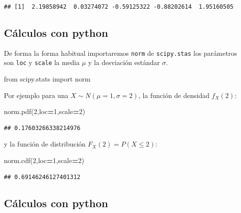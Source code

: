 \documentclass[]{book}
\newenvironment{Shaded}{\begin{snugshade}}{\end{snugshade}}
\newcommand{\DecValTok}[1]{\textcolor[rgb]{0.00,0.00,0.81}{#1}}
\newcommand{\ImportTok}[1]{#1}
\newcommand{\NormalTok}[1]{#1}
\newcommand{\OperatorTok}[1]{\textcolor[rgb]{0.81,0.36,0.00}{\textbf{#1}}}
\begin{document}
\begin{verbatim}
## [1]  2.19858942  0.03274072 -0.59125322 -0.88202614  1.95160505
\end{verbatim}

\hypertarget{cuxe1lculos-con-python-18}{%
\subsection{Cálculos con python}\label{cuxe1lculos-con-python-18}}

De forma la forma habitual importaremos \texttt{norm} de \texttt{scipy.stas} los parámetros son \texttt{loc} y \texttt{scale} la media \(\mu\) y la desviación estándar \(\sigma\).

\begin{Shaded}
\begin{Highlighting}[]
\ImportTok{from}\NormalTok{ scipy.stats }\ImportTok{import}\NormalTok{ norm}
\end{Highlighting}
\end{Shaded}

Por ejemplo para una \(X\sim N(\mu=1,\sigma=2)\), la función de densidad \(f_X(2)\):

\begin{Shaded}
\begin{Highlighting}[]
\NormalTok{norm.pdf(}\DecValTok{2}\NormalTok{,loc}\OperatorTok{=}\DecValTok{1}\NormalTok{,scale}\OperatorTok{=}\DecValTok{2}\NormalTok{)}
\end{Highlighting}
\end{Shaded}

\begin{verbatim}
## 0.17603266338214976
\end{verbatim}

y la función de distribución \(F_X(2) = P(X\leq 2)\):

\begin{Shaded}
\begin{Highlighting}[]
\NormalTok{norm.cdf(}\DecValTok{2}\NormalTok{,loc}\OperatorTok{=}\DecValTok{1}\NormalTok{,scale}\OperatorTok{=}\DecValTok{2}\NormalTok{)}
\end{Highlighting}
\end{Shaded}

\begin{verbatim}
## 0.69146246127401312
\end{verbatim}

\hypertarget{cuxe1lculos-con-python-19}{%
\subsection{Cálculos con python}\label{cuxe1lculos-con-python-19}}
\end{document}
